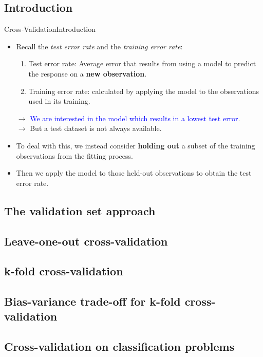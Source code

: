 \subsection{Introduction}
\begin{frame}{Cross-Validation}{Introduction}

\begin{itemize}
    \item Recall the \textit{test error rate} and the \textit{training error rate}: \pause
    \begin{enumerate}
        \item Test error rate: Average error that results from using a model to predict the response on a \textbf{new observation}. \pause
        \item Training error rate: calculated by applying the model to the observations used in its training. \pause 
    \end{enumerate}

    $\rightarrow$ \textcolor{blue}{We are interested in the model which results in a lowest test error}. \pause \\
    $\rightarrow$ But a test dataset is not always available. \pause

    \item To deal with this, we instead consider \textbf{holding out} a subset of the training observations from the fitting process. \pause \\ 
    
    \item Then we apply the model to those held-out observations to obtain the test error rate. 
    
\end{itemize}
    
\end{frame}

\subsection{The validation set approach}


\subsection{Leave-one-out cross-validation}


\subsection{k-fold cross-validation}


\subsection{Bias-variance trade-oﬀ for k-fold cross-validation}


\subsection{Cross-validation on classification problems}

